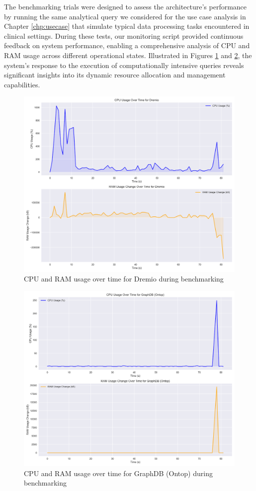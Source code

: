 The benchmarking trials were designed to assess the architecture's performance by running the same analytical query we considered for the use case analysis in Chapter \ref{chp:usecase} that simulate typical data processing tasks encountered in clinical settings. During these tests, our monitoring script provided continuous feedback on system performance, enabling a comprehensive analysis of CPU and RAM usage across different operational states.
Illustrated in Figures \ref{fig:bench_Dremio} and \ref{fig:bench_GraphDB}, the system's response to the execution of computationally intensive queries reveals significant insights into its dynamic resource allocation and management capabilities.
\begin{figure}[!ht] 
    \centering 
    \includegraphics[width=11.6cm]{res/Dremio_usage_plot.png} 
    \caption{CPU and RAM usage over time for Dremio during benchmarking} 
    \label{fig:bench_Dremio}
\end{figure}
\begin{figure}[!ht] 
    \centering 
    \includegraphics[width=11.6cm]{res/GraphDB (Ontop)_usage_plot.png} 
    \caption{CPU and RAM usage over time for GraphDB (Ontop) during benchmarking} 
    \label{fig:bench_GraphDB}
\end{figure}
